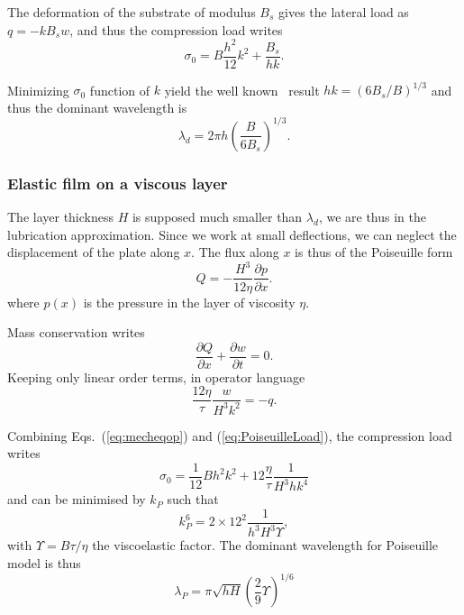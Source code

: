 \documentclass[twocolumn,superscriptaddress,showpacs,preprintnumbers,amsmath,amssymb,prl]{revtex4-1}
\begin{document}
The deformation of the substrate of modulus $B_s$ gives the lateral load as $q = -k B_s w$, and thus the compression load writes
\begin{equation}
\sigma_0 = B \frac{h^2}{12} k^2 + \frac{B_s}{hk}.
\label{eq:sigma0}
\end{equation}

Minimizing $\sigma_0$ function of $k$ yield the well known~\cite{Biot1957,Cerda2003} result $hk = \left(6B_s/B\right)^{1/3}$ and thus the dominant wavelength is
\begin{equation}
\lambda_d = 2\pi h \left(\frac{B}{6B_s}\right)^{1/3}.
\label{eq:lambdaElEl}
\end{equation}

\subsubsection*{Elastic film on a viscous layer}
The layer thickness $H$ is supposed much smaller than $\lambda_d$, we are thus in the lubrication approximation. Since we work at small deflections, we can neglect the displacement of the plate along $x$. The flux along $x$ is thus of the Poiseuille form
\begin{equation}
Q = -\frac{H^3}{12\eta}\frac{\partial p}{\partial x}.
\label{eq:PoiseuilleFlux}
\end{equation}
where $p(x)$ is the pressure in the layer of viscosity $\eta$.

Mass conservation writes
\begin{equation}
\frac{\partial Q}{\partial x} + \frac{\partial w}{\partial t} = 0.
\label{eq:conservation}
\end{equation}
Keeping only linear order terms, in operator language
\begin{equation}
\frac{12\eta}{\tau} \frac{w}{H^3k^2} = -q.
\label{eq:PoiseuilleLoad}
\end{equation}

Combining Eqs.~(\ref{eq:mecheqop}) and (\ref{eq:PoiseuilleLoad}), the compression load writes
\begin{equation}
\sigma_0 = \frac{1}{12}B h^2 k^2 + 12\frac{\eta}{\tau}\frac{1}{H^3 h k^4}
\label{eq:sigma0P}
\end{equation}
and can be minimised by $k_P$ such that
\begin{equation}
k_P^6 = 2\times 12^2 \frac{1}{h^3H^3\Upsilon},
\label{eq:kP}
\end{equation}
with $\Upsilon = B\tau/\eta$ the viscoelastic factor. The dominant wavelength for Poiseuille model is thus
\begin{equation}
\lambda_P = \pi\sqrt{hH}\left(\frac{2}{9}\Upsilon\right)^{1/6}
\end{equation}
\end{document}
